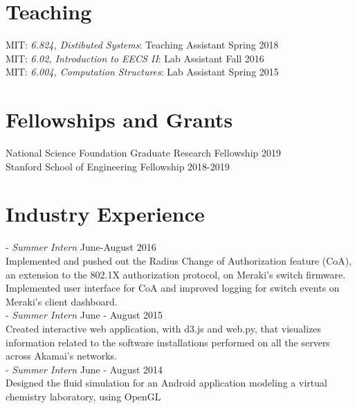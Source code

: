 \documentclass[11pt]{report}
\begin{document}
\section{Teaching}
MIT: \emph{6.824, Distibuted Systems}: Teaching Assistant \hfill Spring 2018\\
\noindent MIT: \emph{6.02, Introduction to EECS II}: Lab Assistant \hfill Fall 2016\\
\noindent MIT: \emph{6.004, Computation Structures}: Lab Assistant \hfill Spring 2015

\section{Fellowships and Grants}
National Science Foundation Graduate Research Fellowship \hfill 2019\\
Stanford School of Engineering Fellowship \hfill 2018-2019\\
\section{Industry Experience}
 - {\em{Summer Intern}}  \hfill  June-August 2016\\
Implemented and pushed out the Radius Change of Authorization feature (CoA), an
extension to the 802.1X authorization protocol, on Meraki's switch firmware. Implemented user interface for CoA and improved logging for switch events on Meraki's client dashboard.\\

 - {\em{Summer Intern}} \hfill June - August 2015\\
Created interactive web application, with d3.js and web.py, that visualizes information
related to the software installations performed on all the servers across Akamai’s networks.\\

 - {\em{Summer Intern}} \hfill June - August 2014\\
Designed the fluid simulation for an Android application modeling a virtual chemistry laboratory, using OpenGL
\end{document}
